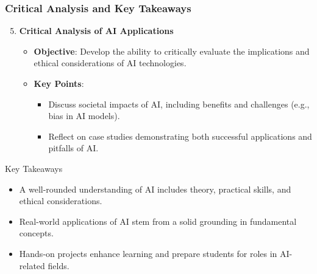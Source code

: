 \documentclass[aspectratio=169]{beamer}
\begin{document}
\begin{frame}[fragile]
    \frametitle{Critical Analysis and Key Takeaways}
    \begin{enumerate}
        \setcounter{enumi}{4}
        \item \textbf{Critical Analysis of AI Applications}
        \begin{itemize}
            \item \textbf{Objective}: Develop the ability to critically evaluate the implications and ethical considerations of AI technologies.
            \item \textbf{Key Points}:
            \begin{itemize}
                \item Discuss societal impacts of AI, including benefits and challenges (e.g., bias in AI models).
                \item Reflect on case studies demonstrating both successful applications and pitfalls of AI.
            \end{itemize}
        \end{itemize}
    \end{enumerate}

    \begin{block}{Key Takeaways}
        \begin{itemize}
            \item A well-rounded understanding of AI includes theory, practical skills, and ethical considerations.
            \item Real-world applications of AI stem from a solid grounding in fundamental concepts.
            \item Hands-on projects enhance learning and prepare students for roles in AI-related fields.
        \end{itemize}
    \end{block}
\end{frame}
\end{document}
